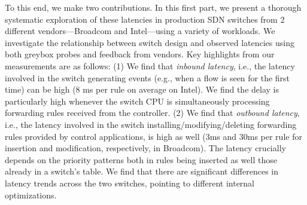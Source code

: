 

 To this end, we make two contributions. In this first part,
 we present a thorough systematic exploration of these latencies in production
 SDN switches from 2 different vendors---Broadcom and Intel---using a
 variety of workloads. We investigate the
 relationship between switch design and observed latencies using both
 greybox probes and feedback from vendors.
 Key highlights from our measurements are as follows: (1) We find that
 {\em inbound latency}, i.e., the latency involved in the switch
 generating events (e.g., when a flow is seen for the first time) can
 be high (8 ms per rule on average on Intel). We find the delay is particularly high
 whenever the switch CPU is simultaneously processing forwarding rules
 received from the controller. (2) We find that {\em outbound latency}, i.e., the
 latency involved in the switch installing/modifying/deleting
 forwarding rules provided by control applications, is high as well
 (3ms and 30ms per rule for insertion and modification, respectively,
 in Broadcom). The latency crucially depends on the priority patterns both in rules being inserted as well those already in a switch's table. We find
 that there are significant differences in latency trends across the two
 switches, pointing to different internal optimizations.


